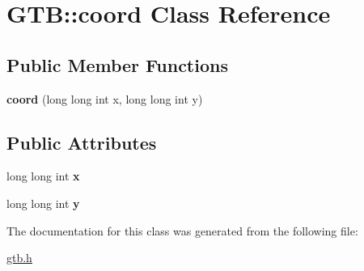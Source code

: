\hypertarget{a00024}{}\section{G\+TB\+:\+:coord Class Reference}
\label{a00024}
\subsection*{Public Member Functions}
\begin{DoxyCompactItemize}
\item 
\mbox{\label{a00024_a06ca8c21b8c157e8ef387dd63879769e}} 
{\bfseries coord} (long long int x, long long int y)
\end{DoxyCompactItemize}
\subsection*{Public Attributes}
\begin{DoxyCompactItemize}
\item 
\mbox{\label{a00024_a35f83d59002019943f5166bf81445d42}} 
long long int {\bfseries x}
\item 
\mbox{\label{a00024_ac17a3b1e5c13fc9eaad723c95cb1059b}} 
long long int {\bfseries y}
\end{DoxyCompactItemize}


The documentation for this class was generated from the following file\+:\begin{DoxyCompactItemize}
\item 
\hyperlink{a00005}{gtb.\+h}\end{DoxyCompactItemize}
